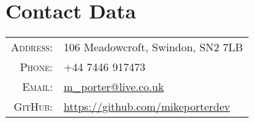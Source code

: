 \section{Contact Data}

\begin{tabular}{rl}
    \textsc{Address:}   & 106 Meadowcroft, Swindon, SN2 7LB \\
    \textsc{Phone:}     & +44 7446 917473 \\
    \textsc{Email:}     & \href{mailto:m_porter@live.co.uk}{m\_porter@live.co.uk} \\
    \textsc{GitHub:}	& \href{https://github.com/mikeporterdev/}{https://github.com/mikeporterdev}
\end{tabular}